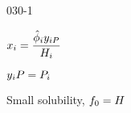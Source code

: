 \begin{mitframe}{030-1}
\begin{listone}
\begin{listtwo}
			\item $\specfrac{i}=\dfrac{\hat{\eleccoeff}_{\state}y_{\state\p}}{\enthalpy_{\state}}$        
                       
        	\begin{listthree}

				\item $y_{\state}\p=\p_{\state}$          
            	
        	\end{listthree}   
            
            \item Small solubility, $\fug_{0}=\enthalpy$
            
        \end{listtwo}               

	\end{listone}        
        
\end{mitframe}